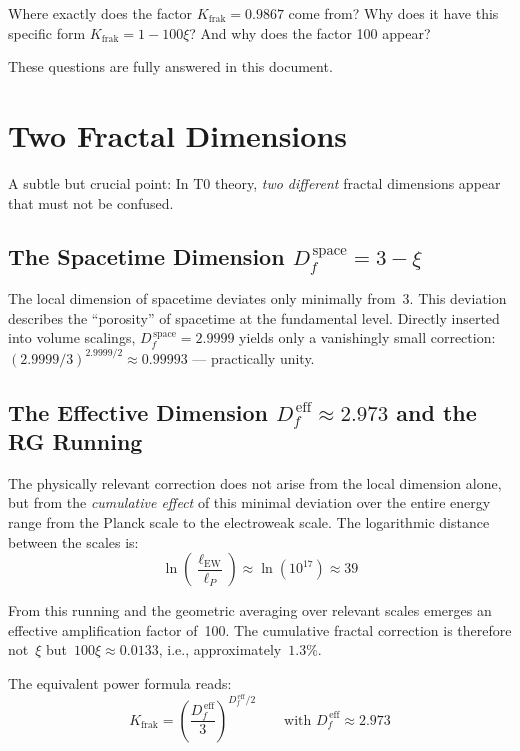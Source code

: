 	Where exactly does the factor $K_{\text{frak}} = 0.9867$ come from? Why does it have this specific form $K_{\text{frak}} = 1 - 100\xi$? And why does the factor 100 appear?
	
	These questions are fully answered in this document.
	
	\section{Two Fractal Dimensions}
	
	A subtle but crucial point: In T0 theory, \emph{two different} fractal dimensions appear that must not be confused.
	
	\subsection{The Spacetime Dimension $D_f^{\,\text{space}} = 3 - \xi$}
	
	The local dimension of spacetime deviates only minimally from~3. This deviation describes the ``porosity'' of spacetime at the fundamental level. Directly inserted into volume scalings, $D_f^{\,\text{space}} = 2.9999$ yields only a vanishingly small correction: $(2.9999/3)^{2.9999/2} \approx 0.99993$ --- practically unity.
	
	\subsection{The Effective Dimension $D_f^{\,\text{eff}} \approx 2.973$ and the RG Running}
	
	The physically relevant correction does not arise from the local dimension alone, but from the \emph{cumulative effect} of this minimal deviation over the entire energy range from the Planck scale to the electroweak scale. The logarithmic distance between the scales is:
	\begin{equation}
		\ln\!\left(\frac{\ell_{\text{EW}}}{\ell_P}\right) \approx \ln(10^{17}) \approx 39
	\end{equation}
	
	From this running and the geometric averaging over relevant scales emerges an effective amplification factor of~100. The cumulative fractal correction is therefore not~$\xi$ but~$100\xi \approx 0.0133$, i.e., approximately~$1.3\%$.
	
	The equivalent power formula reads:
	\begin{equation}
		K_{\text{frak}} = \left(\frac{D_f^{\,\text{eff}}}{3}\right)^{\!D_f^{\,\text{eff}}/2} \qquad \text{with } D_f^{\,\text{eff}} \approx 2.973
	\end{equation}
	
